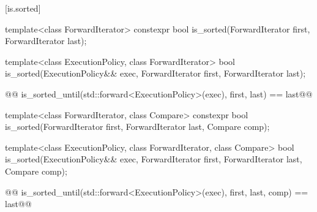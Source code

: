 [is.sorted]{}

%
\begin{itemdecl}
template<class ForwardIterator>
  constexpr bool is_sorted(ForwardIterator first, ForwardIterator last);
\end{itemdecl}

\begin{itemdescr}
\pnum
\removed{\returns} 
\end{itemdescr}

%
\begin{itemdecl}
template<class ExecutionPolicy, class ForwardIterator>
  bool is_sorted(ExecutionPolicy&& exec,
                 ForwardIterator first, ForwardIterator last);
\end{itemdecl}

\begin{itemdescr}
\pnum
\removed{\returns}
\begin{codeblock}
@@ is_sorted_until(std::forward<ExecutionPolicy>(exec), first, last) == last@\added{;}@
\end{codeblock}
\end{itemdescr}

%
\begin{itemdecl}
template<class ForwardIterator, class Compare>
  constexpr bool is_sorted(ForwardIterator first, ForwardIterator last,
                           Compare comp);
\end{itemdecl}

\begin{itemdescr}
\pnum
\removed{\returns} 
\end{itemdescr}


%
\begin{itemdecl}
template<class ExecutionPolicy, class ForwardIterator, class Compare>
  bool is_sorted(ExecutionPolicy&& exec,
                 ForwardIterator first, ForwardIterator last,
                 Compare comp);
\end{itemdecl}

\begin{itemdescr}
\pnum
\removed{\returns}
\begin{codeblock}
@@ is_sorted_until(std::forward<ExecutionPolicy>(exec), first, last, comp) == last@\added{;}@
\end{codeblock}
\end{itemdescr}

